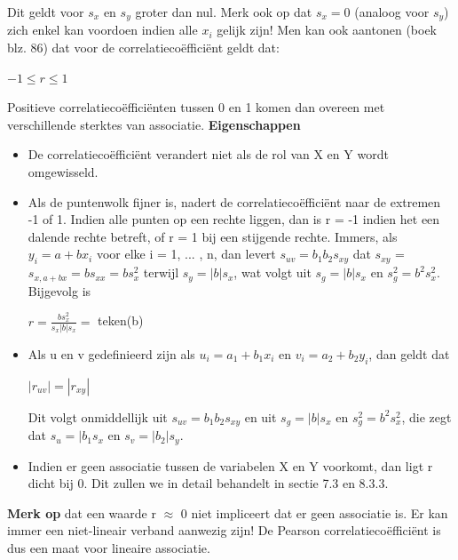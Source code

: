 \documentclass[titlepage]{article}
\numberwithin{equation}{section}
\begin{document}
 Dit geldt voor $s_{x}$ en $s_{y}$ groter dan nul. Merk ook op dat $s_{x} = 0$ (analoog voor $s_{y}$) zich enkel kan voordoen indien alle $x_{i}$ gelijk zijn!
 Men kan ook aantonen (boek blz. 86) dat voor de correlatiecoëfficiënt geldt dat:
 \begin{center}
 	$-1 \leq r \leq 1$
 \end{center}
 Positieve correlatiecoëfficiënten tussen 0 en 1 komen dan overeen met verschillende sterktes van associatie.\newline\newline
 \textbf{Eigenschappen}
 \begin{itemize}
 	\item De correlatiecoëfficiënt verandert niet als de rol van X en Y wordt omgewisseld.
 	\item Als de puntenwolk fijner is, nadert de correlatiecoëfficiënt naar de extremen -1 of 1. Indien alle punten op een rechte liggen, dan is r = -1 indien het een dalende rechte betreft, of r = 1 bij een stijgende rechte. Immers, als $y_{i} = a + bx_{i}$ voor elke i = 1, ... , n, dan levert $s_{uv} = b_{1}b_{2}s_{xy}$ dat $s_{xy}$ = $s_{x,a+bx} = bs_{xx} = bs_{x}^2$ terwijl $s_{y} = |b|s_{x}$, wat volgt uit $s_{g} = |b| s_{x}$ en $s_{g}^2 = b^2s_{x}^2$. Bijgevolg is
 		 \begin{center}
 		 	$r = \frac{bs_{x}^2}{s_{x}|b|s_{x}} = $ teken(b)
 		 \end{center}
 	\item Als u en v gedefinieerd zijn als $u_{i} = a_{1} + b_{1}x_{i}$ en $v_{i} = a_{2} + b_{2}y_{i}$, dan geldt dat
 		 \begin{center}
 		 	$|r_{uv}|=|r_{xy}|$
 		 \end{center}
 		 Dit volgt onmiddellijk uit $s_{uv} = b_{1}b_{2}s_{xy}$ en uit $s_{g} = |b| s_{x}$ en $s_{g}^2 = b^2s_{x}^2$, die zegt dat $s_{u}=|b_{1}s_{x}$ en $s_{v} = |b_{2}|s_{y}$. 
 	\item Indien er geen associatie tussen de variabelen X en Y voorkomt, dan ligt r dicht bij 0. Dit zullen we in detail behandelt in sectie 7.3 en 8.3.3.
 \end{itemize}
 \textbf{Merk op} dat een waarde r $\approx$ 0 niet impliceert dat er geen associatie is. Er kan immer een niet-lineair verband aanwezig zijn! De Pearson correlatiecoëfficiënt is dus een maat voor lineaire associatie.
\end{document}
